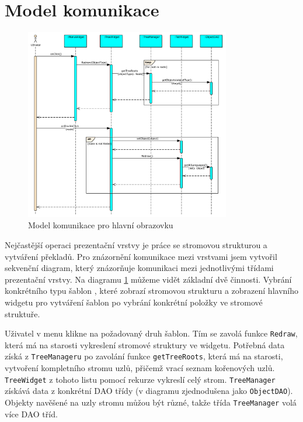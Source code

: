 \documentclass[thesis=B,czech]{resources/FITthesis}[2012/06/26]
\begin{document}
	\section{Model komunikace}
	\begin{figure}\centering
	\includegraphics[width=0.8\textwidth]{images/comunication_main}
	\caption[Model komunikace pro hlavní obrazovku]{Model komunikace pro hlavní obrazovku}\label{fig:comunication_main}
	\end{figure}
Nejčastější operaci prezentační vrstvy je práce se stromovou strukturou a vytváření překladů. Pro znázornění komunikace mezi vrstvami jsem vytvořil sekvenční diagram, který znázorňuje komunikaci mezi jednotlivými třídami prezentační vrstvy. Na diagramu \ref{fig:comunication_main} můžeme vidět základní dvě činnosti. Vybrání konkrétního typu šablon , které zobrazí stromovou strukturu a zobrazení hlavního widgetu pro vytváření šablon po vybrání konkrétní položky ve stromové struktuře.\par

Uživatel v menu klikne na požadovaný druh šablon. Tím se zavolá funkce \texttt{Redraw}, která má na starosti vykreslení stromové struktury ve widgetu. Potřebná data získá z \texttt{TreeManageru} po zavolání funkce \texttt{getTreeRoots}, která má na starosti, vytvoření kompletního stromu uzlů, přičemž vrací seznam kořenových uzlů. \texttt{TreeWidget} z tohoto listu pomocí rekurze vykreslí celý strom. \texttt{TreeManager} získává data z konkrétní DAO třídy (v diagramu zjednodušena jako \texttt{ObjectDAO}). Objekty navěšené na uzly stromu můžou být různé, takže třída \texttt{TreeManager} volá více DAO tříd.\par
\end{document}
